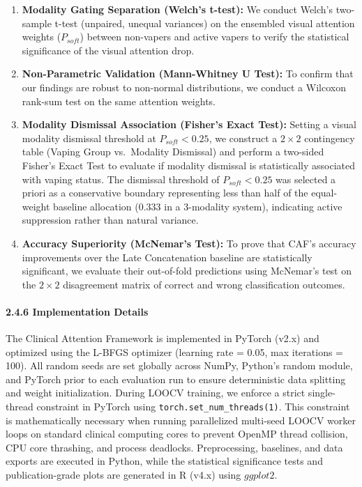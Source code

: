 \documentclass[
]{article}
\begin{document}
\begin{enumerate}
\def\labelenumi{\arabic{enumi}.}
\item
  \textbf{Modality Gating Separation (Welch's t-test):} We conduct
  Welch's two-sample t-test (unpaired, unequal variances) on the
  ensembled visual attention weights (\(P_{soft}\)) between non-vapers
  and active vapers to verify the statistical significance of the visual
  attention drop.
\item
  \textbf{Non-Parametric Validation (Mann-Whitney U Test):} To confirm
  that our findings are robust to non-normal distributions, we conduct a
  Wilcoxon rank-sum test on the same attention weights.
\item
  \textbf{Modality Dismissal Association (Fisher's Exact Test):} Setting
  a visual modality dismissal threshold at \(P_{soft} < 0.25\), we
  construct a \(2 \times 2\) contingency table (Vaping Group
  vs.~Modality Dismissal) and perform a two-sided Fisher's Exact Test to
  evaluate if modality dismissal is statistically associated with vaping
  status. The dismissal threshold of \(P_{soft} < 0.25\) was selected a
  priori as a conservative boundary representing less than half of the
  equal-weight baseline allocation (\(0.333\) in a 3-modality system),
  indicating active suppression rather than natural variance.
\item
  \textbf{Accuracy Superiority (McNemar's Test):} To prove that CAF's
  accuracy improvements over the Late Concatenation baseline are
  statistically significant, we evaluate their out-of-fold predictions
  using McNemar's test on the \(2 \times 2\) disagreement matrix of
  correct and wrong classification outcomes.
\end{enumerate}

\paragraph{\texorpdfstring{\textbf{2.4.6 Implementation
Details}}{2.4.6 Implementation Details}}\label{implementation-details}

The Clinical Attention Framework is implemented in PyTorch (v2.x) and
optimized using the L-BFGS optimizer (learning rate = 0.05, max
iterations = 100). All random seeds are set globally across NumPy,
Python's random module, and PyTorch prior to each evaluation run to
ensure deterministic data splitting and weight initialization. During
LOOCV training, we enforce a strict single-thread constraint in PyTorch
using
\texttt{torch.set\_num\_\textasciigrave{}\textasciigrave{}threads(\textasciigrave{}\textasciigrave{}1)}.
This constraint is mathematically necessary when running parallelized
multi-seed LOOCV worker loops on standard clinical computing cores to
prevent OpenMP thread collision, CPU core thrashing, and process
deadlocks. Preprocessing, baselines, and data exports are executed in
Python, while the statistical significance tests and publication-grade
plots are generated in R (v4.x) using \(ggplot2\).
\end{document}
